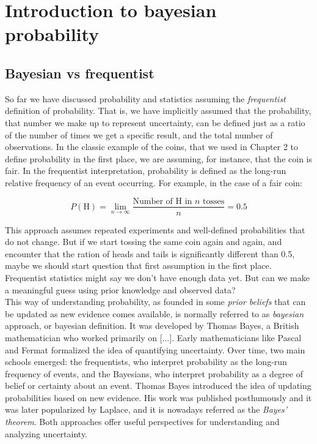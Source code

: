 \documentclass{book}
\begin{document}
\chapter{Introduction to bayesian probability}

\section{Bayesian vs frequentist}

So far we have discussed probability and statistics assuming the \textit{frequentist} definition of probability. That is, we have implicitly assumed that the probability, that number we make up to represent uncertainty, can be defined just as a ratio of the number of times we get a specific result, and the total number of observations. In the classic example of the coins, that we used in Chapter 2 to define probability in the first place, we are assuming, for instance, that the coin is fair. In the frequentist interpretation, probability is defined as the long-run relative frequency of an event occurring. For example, in the case of a fair coin:

\[
P(\text{H}) = \lim_{n \to \infty} \frac{\text{Number of H in } n \text{ tosses}}{n} = 0.5
\]

This approach assumes repeated experiments and well-defined probabilities that do not change. But if we start tossing the same coin again and again, and encounter that the ration of heads and tails is significantly different than 0.5, maybe we should start question that first assumption in the first place. Frequentist statistics might say we don't have enough data yet. But can we make a meaningful guess using prior knowledge and observed data? \\

This way of understanding probability, as founded in some \textit{prior beliefs} that can be updated as new evidence comes available, is normally referred to as \textit{bayesian} approach, or bayesian definition. It was developed by Thomas Bayes, a British mathematician who worked primarily on [...]. Early mathematicians like Pascal and Fermat formalized the idea of quantifying uncertainty. Over time, two main schools emerged: the frequentists, who interpret probability as the long-run frequency of events, and the Bayesians, who interpret probability as a degree of belief or certainty about an event. Thomas Bayes introduced the idea of updating probabilities based on new evidence. His work was published posthumously and it was later popularized by Laplace, and it is nowadays referred as the \textit{Bayes’ theorem}. Both approaches offer useful perspectives for understanding and analyzing uncertainty.\\
\end{document}
